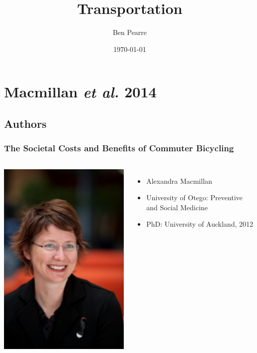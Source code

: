 \documentclass{beamer}
\title[Transportation]{Transportation}
\author{Ben Pearre}
\date{\today}
\begin{document}



\section{Macmillan {\it et al.} 2014}

\subsection{Authors}

\begin{frame}
  \frametitle{The Societal Costs and Benefits of Commuter Bicycling}
  \begin{columns}
    \includegraphics[height=0.3\textheight]{AlexMacmillan.jpg}
    \begin{itemize}
    \item Alexandra Macmillan
    \item University of Otego: Preventive and Social Medicine
    \item PhD: University of Auckland, 2012

\end{itemize}
\end{columns}
\end{frame}
\end{document}
